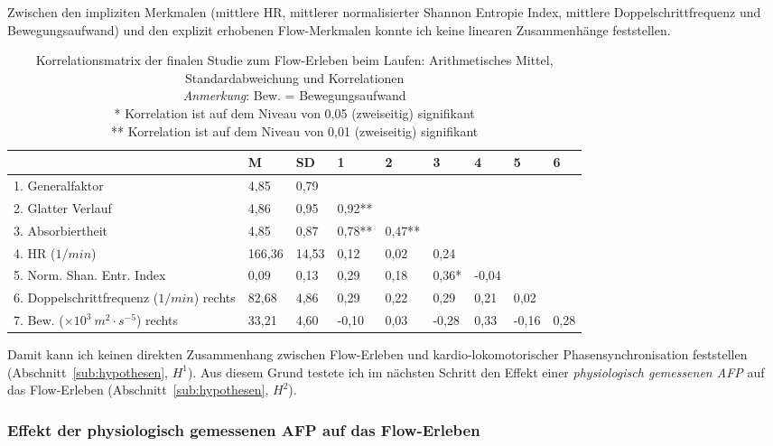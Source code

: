 Zwischen den impliziten Merkmalen (mittlere \ac{HR}, mittlerer normalisierter Shannon Entropie Index, mittlere Doppelschrittfrequenz und Bewegungsaufwand) und den explizit erhobenen Flow-Merkmalen konnte ich keine linearen Zusammenhänge feststellen.
\begin{sidewaystable}
	\centering \caption[Korrelationsmatrix (Finale Studie: Laufen)]{Korrelationsmatrix der finalen Studie zum Flow-Erleben beim Laufen: Arithmetisches Mittel, Standardabweichung und Korrelationen\\
	\hspace{
	\textwidth}\emph{Anmerkung}: Bew. = Bewegungsaufwand \\
	\hspace{
	\textwidth}* Korrelation ist auf dem Niveau von 0,05 (zweiseitig) signifikant \\
	\hspace{
	\textwidth}** Korrelation ist auf dem Niveau von 0,01 (zweiseitig) signifikant} \label{tab:korrelationen_3} 
	\begin{tabular}
		{lxxxxxxxx} \toprule & M & SD & 1 & 2 & 3 & 4 & 5 & 6 \\
		. Generalfaktor & 4,85 & 0,79 & & & & & & \\
		2. Glatter Verlauf & 4,86 & 0,95 & 0,92** & & & & & \\
		3. Absorbiertheit & 4,85 & 0,87 & 0,78** & 0,47** & & & & \\
		4. \ac{HR} ($1/min$) & 166,36 & 14,53 & 0,12 & 0,02 & 0,24 & & & \\
		5. Norm. Shan. Entr. Index & 0,09 & 0,13 & 0,29 & 0,18 & 0,36* & -0,04 & & \\
		6. Doppelschrittfrequenz ($1/min$) rechts & 82,68 & 4,86 & 0,29 & 0,22 & 0,29 & 0,21 & 0,02 & \\
		7. Bew. ($\times 10^3 \: m^2 \cdot s^{-5}$) rechts & 33,21 & 4,60 & -0,10 & 0,03 & -0,28 & 0,33 & -0,16 & 0,28 \\
		\bottomrule 
	\end{tabular}
\end{sidewaystable}

Damit kann ich keinen direkten Zusammenhang zwischen Flow-Erleben und kardio-lokomotorischer Phasensynchronisation feststellen (Abschnitt~\ref{sub:hypothesen}, $H^1$). Aus diesem Grund testete ich im nächsten Schritt den Effekt einer \emph{physiologisch gemessenen \ac{AFP}} auf das Flow-Erleben (Abschnitt~\ref{sub:hypothesen}, $H^2$).

\subsubsection{Effekt der physiologisch gemessenen \ac{AFP} auf das Flow-Erleben} 

